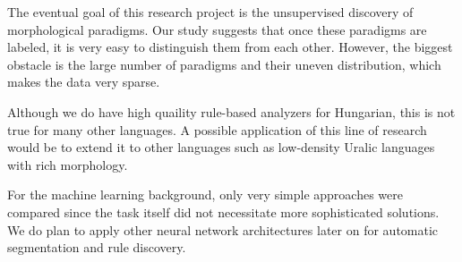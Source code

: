 \documentclass{article}
\begin{document}
The eventual goal of this research project is the unsupervised discovery of morphological paradigms.
Our study suggests that once these paradigms are labeled, it is very easy to distinguish them from each other.
However, the biggest obstacle is the large number of paradigms and their uneven distribution, which makes the data very sparse.

Although we do have high quaility rule-based analyzers for Hungarian, this is not true for many other languages.
A possible application of this line of research would be to extend it to other languages such as low-density Uralic languages with rich morphology.

For the machine learning background, only very simple approaches were compared since the task itself did not necessitate more sophisticated solutions.
We do plan to apply other neural network architectures later on for automatic segmentation and rule discovery.
\end{document}
